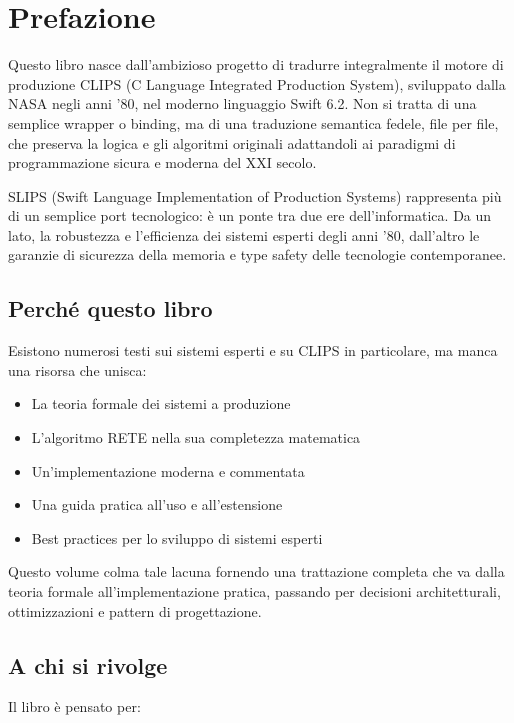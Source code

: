 \documentclass[12pt,a4paper,twoside,openright]{book}
\theoremstyle{definition}
\theoremstyle{remark}
\begin{document}
\chapter*{Prefazione}

Questo libro nasce dall'ambizioso progetto di tradurre integralmente il motore di produzione CLIPS (C Language Integrated Production System), sviluppato dalla NASA negli anni '80, nel moderno linguaggio Swift 6.2. Non si tratta di una semplice wrapper o binding, ma di una traduzione semantica fedele, file per file, che preserva la logica e gli algoritmi originali adattandoli ai paradigmi di programmazione sicura e moderna del XXI secolo.

SLIPS (Swift Language Implementation of Production Systems) rappresenta più di un semplice port tecnologico: è un ponte tra due ere dell'informatica. Da un lato, la robustezza e l'efficienza dei sistemi esperti degli anni '80, dall'altro le garanzie di sicurezza della memoria e type safety delle tecnologie contemporanee.

\section*{Perché questo libro}

Esistono numerosi testi sui sistemi esperti e su CLIPS in particolare, ma manca una risorsa che unisca:

\begin{itemize}
\item La teoria formale dei sistemi a produzione
\item L'algoritmo RETE nella sua completezza matematica
\item Un'implementazione moderna e commentata
\item Una guida pratica all'uso e all'estensione
\item Best practices per lo sviluppo di sistemi esperti
\end{itemize}

Questo volume colma tale lacuna fornendo una trattazione completa che va dalla teoria formale all'implementazione pratica, passando per decisioni architetturali, ottimizzazioni e pattern di progettazione.

\section*{A chi si rivolge}

Il libro è pensato per:
\end{document}
